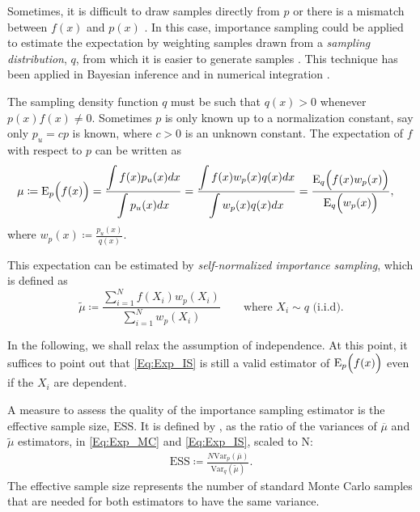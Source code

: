 \documentclass{amsart}
\newcommand{\Var}{\mathrm{Var}}
\theoremstyle{plain}%
\begin{document}
Sometimes, it is difficult to draw samples directly from $p$ or there is a mismatch between $f(x)$ and $p(x)$ \citep{Owen_2013}. 
In this case, importance sampling could be applied to estimate the expectation by weighting samples drawn from a \emph{sampling distribution}, $q$, from which it is easier to generate samples
\citep{Egloff_2010}. This technique has been applied in Bayesian inference \citep{Gelman_2013} and in numerical integration \citep{Liu_2008, Owen_2013}.

The sampling density function $q$ must be such that $q(x) > 0$ whenever $p(x)f(x) \neq 0$. 
Sometimes $p$ is only known up to a normalization constant,  say only $p_u = cp$ is known, 
where $c > 0$ is an unknown constant.
The expectation of $f$ with respect to $p$ can be written as
\begin{align}
\mu \coloneqq
\mathrm{E}_p\Bigl(f (x)\Bigr)  &= \frac{\displaystyle \int f(x)p_u(x) dx}{\displaystyle \int p_u(x) dx} = \frac{\displaystyle \int f(x) w_p(x) q(x) dx}{\displaystyle \int w_p(x)q(x) dx} = \frac{\mathrm{E}_q\Bigl(f(x)w_p(x)\Bigr)}{\mathrm{E}_q\Bigl(w_p(x)\Bigr)}, 
\end{align}
where $w_p(x)\coloneqq \frac{p_u(x)}{q(x)}$.

This expectation can be estimated by \emph{self-normalized importance sampling}, which is defined as
\begin{equation}
\widetilde{\mu}
\coloneqq
\frac{\sum_{i=1}^N f(X_i)w_p(X_i)}{\sum_{i=1}^N w_p(X_i)}
\qquad\text{where }X_i\sim q \text{ (i.i.d)}.
\label{Eq:Exp_IS}
\end{equation}

In the following, we shall relax the assumption of independence.
At this point,
it suffices to point out that \cref{Eq:Exp_IS} is still
a valid estimator of $\mathrm{E}_p \Bigl(f(x) \Bigr)$
even if the $X_i$ are dependent.

A measure to assess the quality of the importance sampling estimator is the effective sample size, $\mathrm{ESS}$. It is defined by \citep{Kong_1992}, as the ratio of the variances of $\overline{\mu}$ and $\widetilde{\mu}$ 
estimators, in \cref{Eq:Exp_MC} and \cref{Eq:Exp_IS}, scaled to N:
\begin{align}
\mathrm{ESS}
\coloneqq
\frac{N\Var_p(\overline{\mu})}{\Var_q(\widetilde{\mu})}. \label{Eq:ESS}
\end{align}
The effective sample size represents the number of
standard Monte Carlo samples that are needed for both estimators to have the
same variance.
\end{document}
